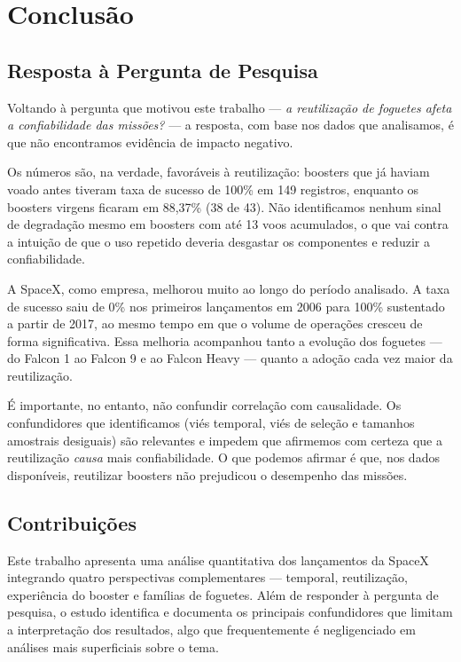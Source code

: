 
\chapter{Conclusão}
\label{chap:conclusion}

\section{Resposta à Pergunta de Pesquisa}

Voltando à pergunta que motivou este trabalho — \textit{a reutilização de foguetes afeta a confiabilidade das missões?} — a resposta, com base nos dados que analisamos, é que não encontramos evidência de impacto negativo.

Os números são, na verdade, favoráveis à reutilização: boosters que já haviam voado antes tiveram taxa de sucesso de 100\% em 149 registros, enquanto os boosters virgens ficaram em 88,37\% (38 de 43). Não identificamos nenhum sinal de degradação mesmo em boosters com até 13 voos acumulados, o que vai contra a intuição de que o uso repetido deveria desgastar os componentes e reduzir a confiabilidade.

A SpaceX, como empresa, melhorou muito ao longo do período analisado. A taxa de sucesso saiu de 0\% nos primeiros lançamentos em 2006 para 100\% sustentado a partir de 2017, ao mesmo tempo em que o volume de operações cresceu de forma significativa. Essa melhoria acompanhou tanto a evolução dos foguetes — do Falcon 1 ao Falcon 9 e ao Falcon Heavy — quanto a adoção cada vez maior da reutilização.

É importante, no entanto, não confundir correlação com causalidade. Os confundidores que identificamos (viés temporal, viés de seleção e tamanhos amostrais desiguais) são relevantes e impedem que afirmemos com certeza que a reutilização \textit{causa} mais confiabilidade. O que podemos afirmar é que, nos dados disponíveis, reutilizar boosters não prejudicou o desempenho das missões.

\section{Contribuições}

Este trabalho apresenta uma análise quantitativa dos lançamentos da SpaceX integrando quatro perspectivas complementares — temporal, reutilização, experiência do booster e famílias de foguetes. Além de responder à pergunta de pesquisa, o estudo identifica e documenta os principais confundidores que limitam a interpretação dos resultados, algo que frequentemente é negligenciado em análises mais superficiais sobre o tema.

